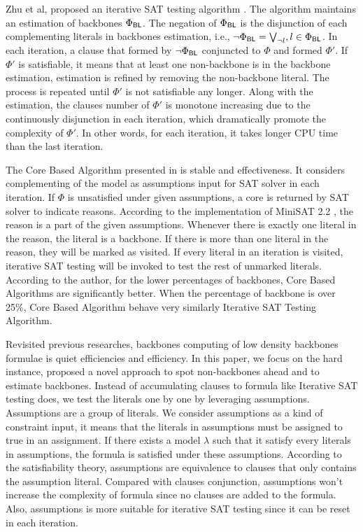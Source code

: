 Zhu et al, proposed an iterative SAT testing algorithm \cite{Z11}. The algorithm maintains an estimation of backbones $\Phi_{\textsf{BL}}$. The negation of $\Phi_{\textsf{BL}}$ is the disjunction of each complementing literals in backbones estimation, i.e., $\neg\Phi_{\textsf{BL}}=\bigvee_{\neg l}, l\in\Phi_{\textsf{BL}}$. In each iteration, a clause that formed by $\neg \Phi_{\textsf{BL}}$ conjuncted to $\Phi$ and formed $\Phi'$. If $\Phi'$ is satisfiable, it means that at least one non-backbone is in the backbone estimation, estimation is refined by removing the non-backbone literal. The process is repeated until $\Phi'$ is not satisfiable any longer. Along with the estimation, the clauses number of $\Phi'$  is monotone increasing due to the continuously disjunction in each iteration, which dramatically promote the complexity of $\Phi'$. In other words, for each iteration, it takes longer CPU time than the last iteration.

The Core Based Algorithm presented in \cite{JLM15} is stable and effectiveness. It considers complementing of the model as assumptions input for SAT solver in each iteration. If $\Phi$ is unsatisfied under given assumptions, a core is returned by SAT solver to indicate reasons. According to the implementation of MiniSAT 2.2 \cite{MINISAT}, the reason is a part of the given assumptions. Whenever there is exactly one literal in the reason, the literal is a backbone. If there is more than one literal in the reason, they will be marked as visited. If every literal in an iteration is visited, iterative SAT testing will be invoked to test the rest of unmarked literals. According to the author, for the lower percentages of backbones, Core Based Algorithms are significantly better. When the percentage of backbone is over 25\%, Core Based Algorithm behave very similarly Iterative SAT Testing Algorithm.

Revisited previous researches, backbones computing of low density backbones formulae is quiet efficiencies and efficiency. In this paper, we focus on the hard instance, proposed a novel approach to spot non-backbones ahead and to estimate backbones. Instead of accumulating clauses to formula like Iterative SAT testing does, we test the literals one by one by leveraging assumptions. Assumptions are a group of literals. We consider assumptions as a kind of constraint input, it means that the literals in assumptions must be assigned to true in an assignment. If there exists a model $\lambda$ such that it satisfy every literals in assumptions, the formula is satisfied under these assumptions. According to the satisfiability theory, assumptions are equivalence to clauses that only contains the assumption literal. Compared with clauses conjunction, assumptions won't increase the complexity of formula since no clauses are added to the formula. Also, assumptions is more suitable for iterative SAT testing since it can be reset in each iteration.

